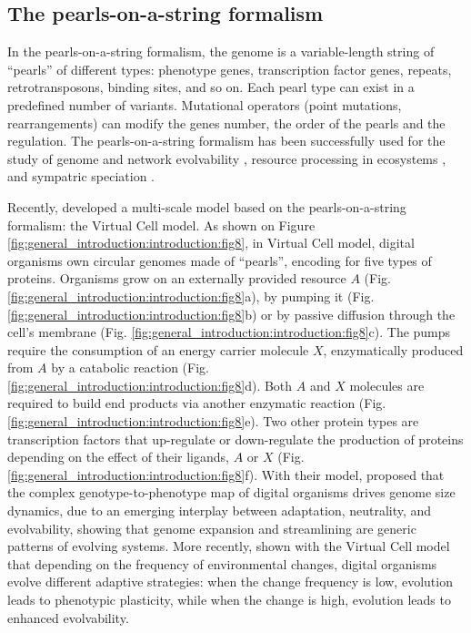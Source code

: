 
\subsection{The pearls-on-a-string formalism}

In the pearls-on-a-string formalism, the genome is a variable-length string of ``pearls'' of different types: phenotype genes, transcription factor genes, repeats, retrotransposons, binding sites, and so on. Each pearl type can exist in a predefined number of variants. Mutational operators (point mutations, rearrangements) can modify the genes number, the order of the pearls and the regulation. The pearls-on-a-string formalism has been successfully used for the study of genome and network evolvability \citep{crombach-hogeweg-2007,crombach-hogeweg-2008}, resource processing in ecosystems \citep{crombach-hogeweg-2009}, and sympatric speciation \citep{tentussscher-hogeweg-2009}.

Recently, \cite{cuypers-hogeweg-2012} developed a multi-scale model based on the pearls-on-a-string formalism: the Virtual Cell model.
As shown on Figure \ref{fig:general_introduction:introduction:fig8}, in Virtual Cell model, digital organisms own circular genomes made of ``pearls'', encoding for five types of proteins. Organisms grow on an externally provided resource $A$ (Fig. \ref{fig:general_introduction:introduction:fig8}a), by pumping it (Fig. \ref{fig:general_introduction:introduction:fig8}b) or by passive diffusion through the cell's membrane (Fig. \ref{fig:general_introduction:introduction:fig8}c). The pumps require the consumption of an energy carrier molecule $X$, enzymatically produced from $A$ by a catabolic reaction (Fig. \ref{fig:general_introduction:introduction:fig8}d). Both $A$ and $X$ molecules are required to build end products via another enzymatic reaction (Fig. \ref{fig:general_introduction:introduction:fig8}e). Two other protein types are transcription factors that up-regulate or down-regulate the production of proteins depending on the effect of their ligands, $A$ or $X$ (Fig. \ref{fig:general_introduction:introduction:fig8}f). With their model, \cite{cuypers-hogeweg-2012} proposed that the complex genotype-to-phenotype map of digital organisms drives genome size dynamics, due to an emerging interplay between adaptation, neutrality, and evolvability, showing that genome expansion and streamlining are generic patterns of evolving systems. More recently, \cite{cuypers-et-al-2017} shown with the Virtual Cell model that depending on the frequency of environmental changes, digital organisms evolve different adaptive strategies: when the change frequency is low, evolution leads to phenotypic plasticity, while when the change is high, evolution leads to enhanced evolvability.

